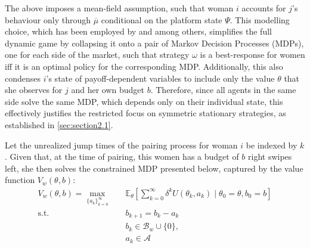 The above imposes a mean-field assumption, such that woman $i$ accounts for $j$'s behaviour only through $\overline\mu$ conditional on the platform state $\Psi$.
This modelling choice, which has been employed by \cite{immorlica2021designing} and \cite{iyer2014mean} among others, simplifies the full dynamic game by collapsing it onto a pair of Markov Decision Processes (MDPs), one for each side of the market, such that strategy $\omega$ is a best-response for women iff it is an optimal policy for the corresponding MDP. 
Additionally, this also condenses $i$'s state of payoff-dependent variables to include only the value $\theta$ that she observes for $j$ and her own budget $b$. 
Therefore, since all agents in the same side solve the same MDP, which depends only on their individual state, this effectively justifies the restricted focus on symmetric stationary strategies, as established in \autoref{sec:section2.1}.

Let the unrealized jump times of the pairing process for woman $i$ be indexed by $k$. 
Given that, at the time of pairing, this women has a budget of $b$ right swipes left, she then solves the constrained MDP presented below, captured by the value function $V_w(\theta,b)$: 
\begin{equation*}
    \begin{aligned} 
        V_w(\theta,b)=\max_{\{a_k\}^\infty_{k=0}} \quad & \mathbb{E}_{\theta}\left[\sum^\infty_{k=0} \delta^{k} U(\theta_k, a_k) \;|\; \theta_0=\theta, b_0=b\right]\\ 
        \textrm{s.t.} \quad & b_{k+1} = b_k - a_k \\
        & b_k\in \mathcal{B}_w \cup \{0\},\\
        & a_k\in \mathcal{A}  
    \end{aligned}
\end{equation*}

